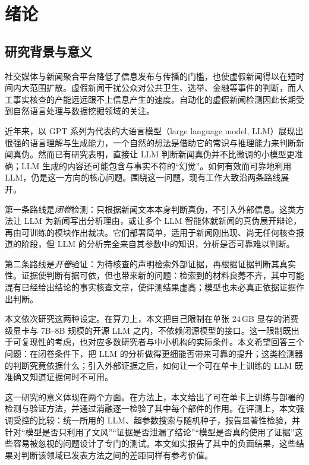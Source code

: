 \chapter{绪论}\label{ch:intro}

\section{研究背景与意义}\label{sec:intro-bg}

社交媒体与新闻聚合平台降低了信息发布与传播的门槛，也使虚假新闻得以在短时间内大范围扩散。虚假新闻干扰公众对公共卫生、选举、金融等事件的判断，而人工事实核查的产能远远跟不上信息产生的速度。自动化的虚假新闻检测因此长期受到自然语言处理与数据挖掘领域的关注\citep{shu2017fake,zhou2020survey,guo2022survey}。

近年来，以 GPT 系列为代表的大语言模型（large language model, LLM）展现出很强的语言理解与生成能力，一个自然的想法是借助它的常识与推理能力来判断新闻真伪。然而已有研究表明，直接让 LLM 判断新闻真伪并不比微调的小模型更准确\citep{hu2024bad}；LLM 生成的内容还可能包含与事实不符的“幻觉”。如何有效而可靠地利用 LLM，仍是这一方向的核心问题。围绕这一问题，现有工作大致沿两条路线展开。

第一条路线是\emph{闭卷}检测：只根据新闻文本本身判断真伪，不引入外部信息。这类方法让 LLM 为新闻写出分析理由，或让多个 LLM 智能体就新闻的真伪展开辩论，再由可训练的模块作出裁决\citep{hu2024bad,he2026factguard,liu2025ted}。它们部署简单，适用于新闻刚出现、尚无任何核查报道的阶段，但 LLM 的分析完全来自其参数中的知识，分析是否可靠难以判断。

第二条路线是\emph{开卷}验证：为待核查的声明检索外部证据，再根据证据判断其真实性\citep{thorne2018fever,yang2022cofced}。证据使判断有据可依，但也带来新的问题：检索到的材料良莠不齐，其中可能混有已经给出结论的事实核查文章，使评测结果虚高\citep{glockner2022missing}；模型也未必真正依据证据作出判断\citep{hansen2021reason,deng2026real}。

本文依次研究这两种设定。在算力上，本文把自己限制在单张 24\,GB 显存的消费级显卡与 7B--8B 规模的开源 LLM 之内，不依赖闭源模型的接口。这一限制既出于可复现性的考虑，也对应多数研究者与中小机构的实际条件。本文希望回答三个问题：在闭卷条件下，把 LLM 的分析做得更细能否带来可靠的提升；这类检测器的判断究竟依据什么；引入外部证据之后，如何让一个可在单卡上训练的 LLM 既准确又知道证据何时不可用。

这一研究的意义体现在两个方面。在方法上，本文给出了可在单卡上训练与部署的检测与验证方法，并通过消融逐一检验了其中每个部件的作用。在评测上，本文强调受控的比较：统一所用的 LLM、超参数搜索与随机种子，报告显著性检验，并针对“模型是否只利用了文风”“证据是否泄漏了结论”“模型是否真的使用了证据”这些容易被忽视的问题设计了专门的测试。本文如实报告了其中的负面结果，这些结果对判断该领域已发表方法之间的差距同样有参考价值。

